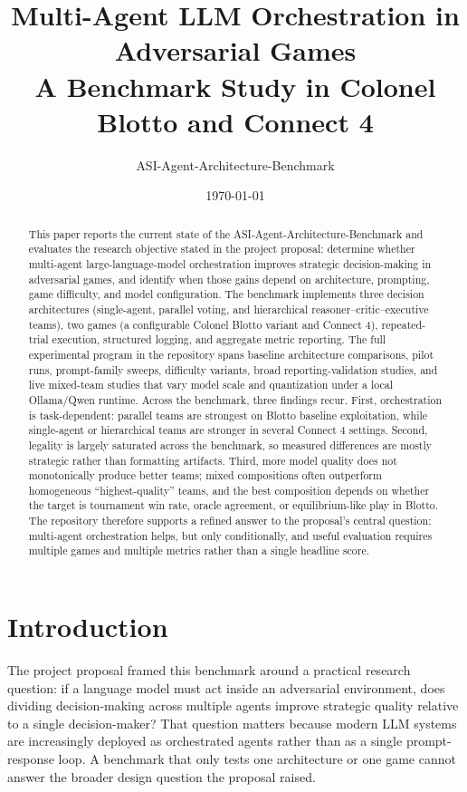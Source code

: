 \documentclass[11pt]{article}
\title{Multi-Agent LLM Orchestration in Adversarial Games\\\large A Benchmark Study in Colonel Blotto and Connect 4}
\author{ASI-Agent-Architecture-Benchmark}
\date{\today}
\begin{document}
\maketitle

\begin{abstract}
This paper reports the current state of the ASI-Agent-Architecture-Benchmark and evaluates the research objective stated in the project proposal: determine whether multi-agent large-language-model orchestration improves strategic decision-making in adversarial games, and identify when those gains depend on architecture, prompting, game difficulty, and model configuration. The benchmark implements three decision architectures (single-agent, parallel voting, and hierarchical reasoner--critic--executive teams), two games (a configurable Colonel Blotto variant and Connect 4), repeated-trial execution, structured logging, and aggregate metric reporting. The full experimental program in the repository spans baseline architecture comparisons, pilot runs, prompt-family sweeps, difficulty variants, broad reporting-validation studies, and live mixed-team studies that vary model scale and quantization under a local Ollama/Qwen runtime. Across the benchmark, three findings recur. First, orchestration is task-dependent: parallel teams are strongest on Blotto baseline exploitation, while single-agent or hierarchical teams are stronger in several Connect 4 settings. Second, legality is largely saturated across the benchmark, so measured differences are mostly strategic rather than formatting artifacts. Third, more model quality does not monotonically produce better teams; mixed compositions often outperform homogeneous ``highest-quality'' teams, and the best composition depends on whether the target is tournament win rate, oracle agreement, or equilibrium-like play in Blotto. The repository therefore supports a refined answer to the proposal's central question: multi-agent orchestration helps, but only conditionally, and useful evaluation requires multiple games and multiple metrics rather than a single headline score.
\end{abstract}

\section{Introduction}
The project proposal framed this benchmark around a practical research question: if a language model must act inside an adversarial environment, does dividing decision-making across multiple agents improve strategic quality relative to a single decision-maker? That question matters because modern LLM systems are increasingly deployed as orchestrated agents rather than as a single prompt-response loop. A benchmark that only tests one architecture or one game cannot answer the broader design question the proposal raised.
\end{document}
